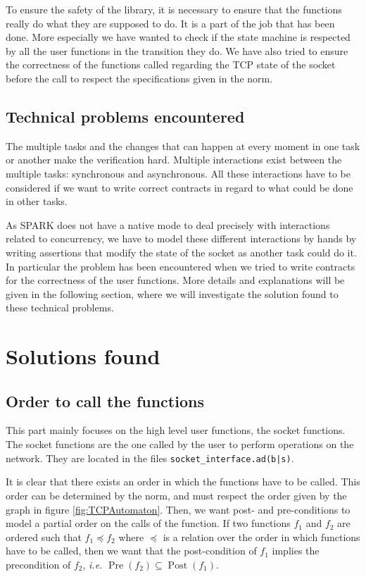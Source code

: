\documentclass[a4paper, 10pt]{article}
\DeclareMathOperator{\Pre}{Pre}
\DeclareMathOperator{\Post}{Post}
\begin{document}
    To ensure the safety of the library, it is necessary to ensure that the functions really
    do what they are supposed to do. It is a part of the job that has been done. More
    especially we have wanted to check if the state machine is respected by all the
    user functions in the transition they do. We have also tried to ensure the correctness
    of the functions called regarding the TCP state of the socket before the call
    to respect the specifications given in the norm.


    \subsection{Technical problems encountered}

    The multiple tasks and the changes that can happen at every moment in one
    task or another make the verification hard. Multiple interactions exist
    between the multiple tasks: synchronous and asynchronous.
    All these interactions have to be considered if we want to write correct contracts
    in regard to what could be done in other tasks.

    As SPARK does not have a native mode to deal precisely with interactions related to concurrency, we have to
    model these different interactions by hands by writing assertions that
    modify the state of the socket as another task could do it. In particular
    the problem has been encountered when we tried to write contracts for the correctness
    of the user functions. More details and explanations will be given in the following
    section, where we will investigate the solution found to these technical problems.

    \section{Solutions found}

    \subsection{Order to call the functions}

    This part mainly focuses on the high level user functions, the socket functions.
    The socket functions are the one called by the user to perform operations on
    the network. They are located in the files \texttt{socket\_interface.ad(b|s)}.

    It is clear that there exists an order in which the functions have to be called.
    This order can be determined by the norm, and must respect the order given by the
    graph in figure \ref{fig:TCPAutomaton}.
    Then, we want post- and pre-conditions to model a partial order on the calls of the function.
    If two functions $f_1$ and $f_2$ are ordered such that $f_1 \preceq f_2$ where $\preceq$ is
    a relation over the order in which functions have to be called, then we want that the
    post-condition of $f_1$ implies the precondition of $f_2$, \textit{i.e.} $\Pre(f_2) \subseteq \Post(f_1)$.
    
\end{document}
